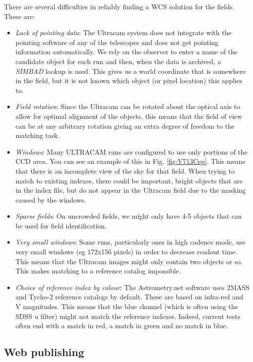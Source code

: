 There are several difficulties in reliably finding a WCS solution for the fields.  These are:
\begin{itemize}
	\item \emph{Lack of pointing data}: The Ultracam system does not integrate with the pointing software of any of the telescopes and does not get pointing information automatically. We rely on the observer to enter a name of the candidate object for each run and then, when the data is archived, a \emph{SIMBAD} lookup is used. This gives us a world coordinate that is somewhere in the field, but it is not known which object (or pixel location) this applies to.  
	\item \emph{Field rotation}: Since the Ultracam can be rotated about the optical axis to allow for optimal alignment of the objects, this means that the field of view can be at any arbitrary rotation giving an extra degree of freedom to the matching task. 
	\item \emph{Windows}: Many ULTRACAM runs are configured to use only portions of the CCD area. You can see an example of this in Fig.  \ref{fig:V713Cep}. This means that there is an incomplete view of the sky for that field. When trying to match to existing indexes, there could be important, bright objects that are in the index file, but do not appear in the Ultracam field due to the masking caused by the windows.
	\item \emph{Sparse fields}: On uncrowded fields, we might only have 4-5 objects that can be used for field identification. 
	\item \emph{Very small windows}: Some runs, particularly ones in high cadence mode, use very small windows (eg 172x156 pixels) in order to decrease readout time. This means that the Ultracam images might only contain two objects or so. This makes matching to a reference catalog impossible. 
	\item \emph{Choice of reference index by colour}: The Astrometry.net software uses 2MASS and Tycho-2 reference catalogs by default. These are based on infra-red and V magnitudes. This means that the blue channel (which is often using the SDSS u filter) might not match the reference indexes. Indeed, current tests often end with a match in red, a match in green and no match in blue. 
\end{itemize}



\subsection{Web publishing}

